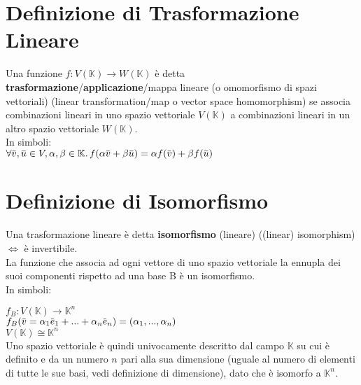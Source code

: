 \documentclass[a4paper, twoside, italian, 11pt]{book}
\newcommand{\overbar}[1] {\mkern 1.5mu\overline{\mkern-1.5mu#1\mkern-1.5mu}\mkern 1.5mu}
\newcommand{\K}{\mathbb K}
\begin{document}



\section{Definizione di Trasformazione Lineare}

Una funzione $f : V(\K) \rightarrow W(\K)$ è detta \textbf{trasformazione}/\textbf{applicazione}/mappa lineare (o omomorfismo di spazi vettoriali) (linear transformation/map o vector space homomorphism) se associa combinazioni lineari in uno spazio vettoriale $V(\K)$ a combinazioni lineari in un altro spazio vettoriale $W(\K)$. \\

\noindent
In simboli: \\

$\forall \overbar v, \overbar u \in V, \alpha, \beta \in \K \ldotp f(\alpha \overbar v + \beta \overbar u) = \alpha f(\overbar v) + \beta f(\overbar u)$ \\



\section{Definizione di Isomorfismo}

Una trasformazione lineare è detta \textbf{isomorfismo} (lineare) ((linear) isomorphism) $\iff$ è invertibile. \\

\noindent
La funzione che associa ad ogni vettore di uno spazio vettoriale la ennupla dei suoi componenti rispetto ad una base B è un isomorfismo. \\

\noindent
In simboli:

$f_B : V(\K) \rightarrow \K^n$ \\
\indent
$f_B(\overbar v = \alpha_1 \overbar e_1 + ... + \alpha_n \overbar e_n) = (\alpha_1, ..., \alpha_n)$ \\

$V(\K) \cong \K^n$ \\

\noindent
Uno spazio vettoriale è quindi univocamente descritto dal campo $\K$ su cui è definito e da un numero $n$ pari alla sua dimensione (uguale al numero di elementi di tutte le sue basi, vedi definizione di dimensione), dato che è isomorfo a $\K^n$. \\
\end{document}
